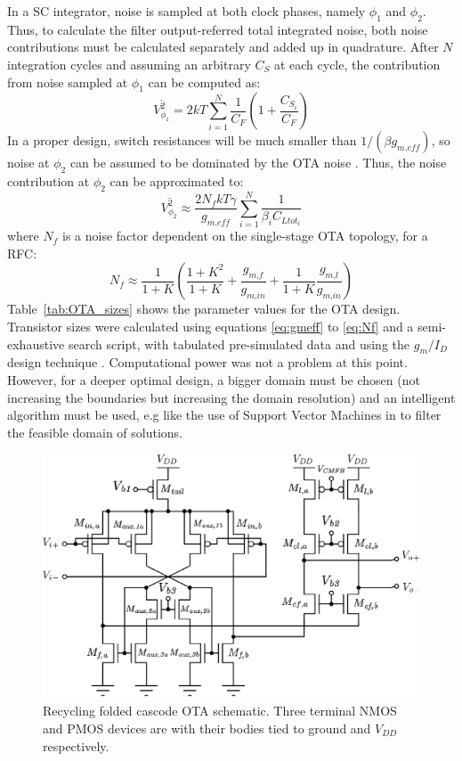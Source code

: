 In a SC integrator, noise is sampled at both clock phases, namely $\phi_1$ and $\phi_2$. Thus, to calculate the filter output-referred total integrated noise, both noise contributions must be calculated separately and added up in quadrature. After $N$ integration cycles and assuming an arbitrary $C_S$ at each cycle, the contribution from noise sampled at $\phi_1$ can be computed as:
\begin{equation}
\overline{V_{\phi_1}^2} = 2 kT \sum_{i=1}^{N} \frac{1}{C_F}\left(1 + \frac{C_{S_i}}{C_F}\right)
\end{equation}
In a proper design, switch resistances will be much smaller than $1/(\beta g_\textit{m,eff})$, so noise at $\phi_2$ can be assumed to be dominated by the OTA noise \citep{vleugels101}. Thus, the noise contribution at $\phi_2$ can be approximated to:
\begin{equation}
\overline{V_{\phi_2}^2} \approx \frac{2 N_f kT\gamma}{g_\textit{m,eff}} \sum_{i=1}^{N} \frac{1}{\beta_i C_{Ltot_i}}
\end{equation}
where $N_f$ is a noise factor dependent on the single-stage OTA topology, for a RFC:
\begin{equation}
N_f \approx \frac1{1+K}\left(\frac{1+K^2}{1+K} + \frac{g_\textit{m,f}}{g_\textit{m,in}} + \frac1{1+K}\frac{g_\textit{m,l}}{g_\textit{m,in}}\right) \label{eq:Nf}
\end{equation}
Table~\ref{tab:OTA_sizes} shows the parameter values for the OTA design. Transistor sizes were calculated using equations \ref{eq:gmeff} to \ref{eq:Nf} and a semi-exhaustive search script, with tabulated pre-simulated data and using the $g_m/I_D$ design technique \citep{silveira101}. Computational power was not a problem at this point. However, for a deeper optimal design, a bigger domain must be chosen (not increasing the boundaries but increasing the domain resolution) and an intelligent algorithm must be used, e.g like the use of Support Vector Machines in \citep{bernardinis101} to filter the feasible domain of solutions.
\begin{figure}[!t]
	\centering
	\includegraphics[width=5.5in]{./Figures/Filter/OTA_post.eps}
	\caption{Recycling folded cascode OTA schematic. Three terminal NMOS and PMOS devices are with their bodies tied to ground and $V_\textit{DD}$ respectively.}\label{fig:OTA_post}
\end{figure}
